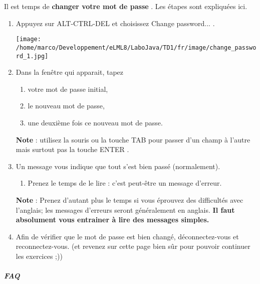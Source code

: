 \documentclass[11pt,a4paper]{article}
\begin{document}
Il est  temps de  \textbf{changer votre mot de passe} . Les \'etapes sont expliqu\'ees ici.
					\begin{enumerate}
				
			\item Appuyez sur ALT-CTRL-DEL  et choisissez Change password... . 
			\begin{boxedminipage}[h]{\linewidth}
		\begin{center}
					\texttt{[image: /home/marco/Developpement/eLML8/LaboJava/TD1/fr/image/change\_password\_1.jpg]}
						\end{center}
                
			\end{boxedminipage}

			\item Dans la fen\^etre qui apparait, tapez
	
					\begin{enumerate}
				
			\item votre mot de passe initial,
			\item le nouveau mot de passe,
			\item une deuxi\`eme fois ce nouveau mot de passe.
					\end{enumerate}
				 \textbf{Note}  : utilisez la souris ou la touche TAB  pour passer d'un champ \`a l'autre mais surtout pas la touche ENTER .
			\item Un message vous indique que tout s'est bien pass\'e (normalement).
	
					\begin{enumerate}
				
			\item Prenez le temps de le lire : c'est peut-\^etre un message d'erreur.
					\end{enumerate}
				 \textbf{Note}  : Prenez d'autant plus le temps si vous \'eprouvez des difficult\'es avec l'anglais; les messages d'erreurs seront g\'en\'eralement en anglais.  \textbf{Il faut absolument vous entrainer \`a lire des messages simples.} 
			\item Afin de v\'erifier que le mot de passe est bien chang\'e, d\'econnectez-vous et reconnectez-vous.
	(et revenez sur cette page bien s\^ur pour pouvoir continuer les exercices ;)) 
					\end{enumerate}
				 \textit{} 
			
		\subparagraph{FAQ} 
		
\end{document}
